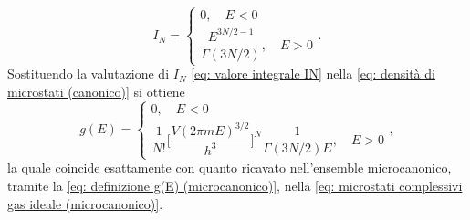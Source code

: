 \begin{equation}
\label{eq: valore integrale IN}
    I_N = 
    \begin{cases}
        0,\quad E < 0 \\[2ex]
        \dfrac{E^{3N/2 - 1}}{\Gamma(3N/2)},\quad E > 0
    \end{cases}.
\end{equation}
Sostituendo la valutazione di $I_N$ \eqref{eq: valore integrale IN} nella \eqref{eq: densità di microstati (canonico)} si ottiene
\begin{equation}
    g(E) = 
    \begin{cases}
        0,\quad E < 0 \\
        \dfrac{1}{N!}\bigg[\dfrac{V(2\pi mE)^{3/2}}{h^3}\bigg]^N\dfrac{1}{\Gamma(3N/2)E},\quad E > 0
    \end{cases},
\end{equation}
la quale coincide esattamente con quanto ricavato nell'ensemble microcanonico, tramite la \eqref{eq: definizione g(E) (microcanonico)}, nella \eqref{eq: microstati complessivi gas ideale (microcanonico)}.


